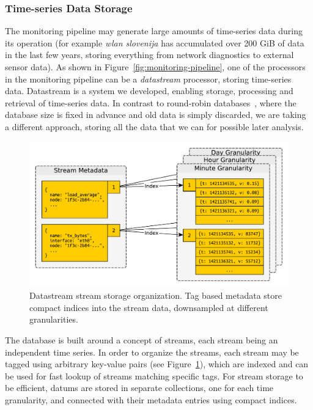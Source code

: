 \documentclass[5p,sort&compress]{elsarticle}
\newcommand{\wlanslovenija}{\textit{wlan slovenija}}
\begin{document}
\subsubsection{Time-series Data Storage}

The monitoring pipeline may generate large amounts of time-series data during its operation (for example \wlanslovenija{} has accumulated over 200 GiB of data in the last few years, storing everything from network diagnostics to external sensor data).
As shown in Figure~\ref{fig:monitoring-pipeline}, one of the processors in the monitoring pipeline can be a \textit{datastream} processor, storing time-series data.
Datastream is a system we developed, enabling storage, processing and retrieval of time-series data.
In contrast to round-robin databases~\cite{Oetiker_1999}, where the database size is fixed in advance and old data is simply discarded, we are taking a different approach, storing all the data that we can for possible later analysis.

\begin{figure}
  \centering
  \includegraphics[scale=0.4]{figures/datastream-storage.pdf}
  \caption{Datastream stream storage organization. Tag based metadata store compact indices into the stream data, downsampled at different granularities.}
  \label{fig:datastream-storage}
\end{figure}

The database is built around a concept of streams, each stream being an independent time series.
In order to organize the streams, each stream may be tagged using arbitrary key-value pairs (see Figure~\ref{fig:datastream-storage}), which are indexed and can be used for fast lookup of streams matching specific tags.
For stream storage to be efficient, datums are stored in separate collections, one for each time granularity, and connected with their metadata entries using compact indices.
\end{document}
